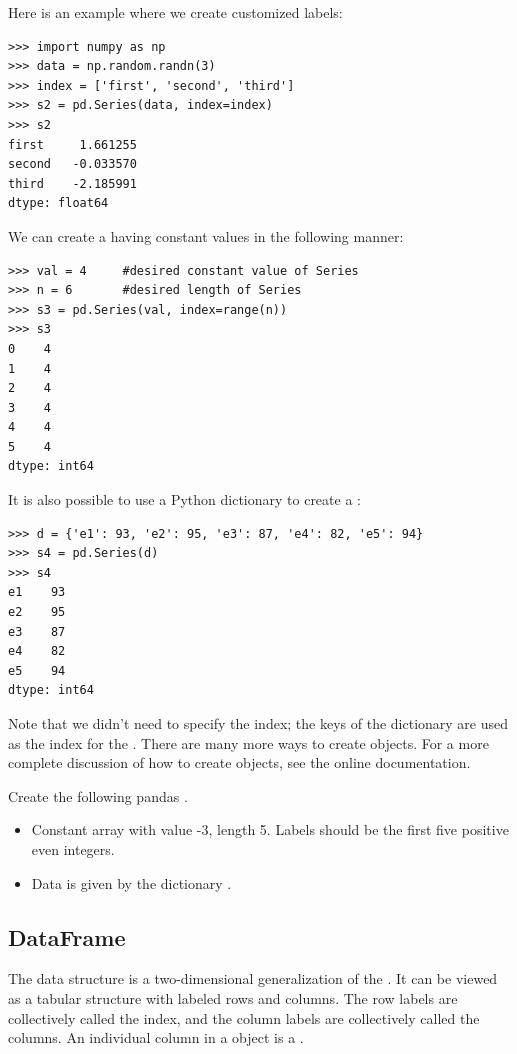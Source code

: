 Here is an example where we create customized labels:
\begin{lstlisting}
>>> import numpy as np
>>> data = np.random.randn(3)
>>> index = ['first', 'second', 'third']
>>> s2 = pd.Series(data, index=index)
>>> s2
first     1.661255
second   -0.033570
third    -2.185991
dtype: float64
\end{lstlisting}

We can create a  having constant values in the following manner:
\begin{lstlisting}
>>> val = 4     #desired constant value of Series
>>> n = 6       #desired length of Series
>>> s3 = pd.Series(val, index=range(n))
>>> s3
0    4
1    4
2    4
3    4
4    4
5    4
dtype: int64
\end{lstlisting}

It is also possible to use a Python dictionary to create a :
\begin{lstlisting}
>>> d = {'e1': 93, 'e2': 95, 'e3': 87, 'e4': 82, 'e5': 94}
>>> s4 = pd.Series(d)
>>> s4
e1    93
e2    95
e3    87
e4    82
e5    94
dtype: int64
\end{lstlisting}
Note that we didn't need to specify the index; the keys of the dictionary are used as the index for the .
There are many more ways to create  objects.
For a more complete discussion of how to create  objects, see the online documentation.

\begin{problem}
Create the following pandas .

\begin{itemize}
\item Constant array with value -3, length 5. Labels should be the first five positive even integers.

\item Data is given by the dictionary .
\end{itemize}
\end{problem}

\subsection*{DataFrame}
The  data structure is a two-dimensional generalization of the . It can be viewed
as a tabular structure with labeled rows and columns. The row labels are collectively called the
index, and the column labels are collectively called the columns. An individual column in a
 object is a .

